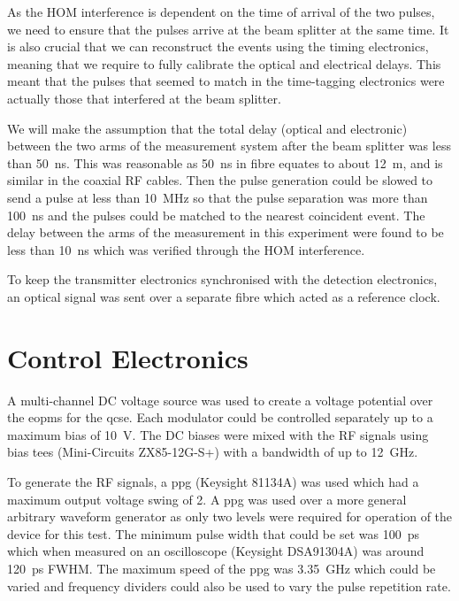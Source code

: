 As the \ac{HOM} interference is dependent on the time of arrival of the two pulses, we need to ensure that the pulses arrive at the beam splitter at the same time. It is also crucial that we can reconstruct the events using the timing electronics, meaning that we require to fully calibrate the optical and electrical delays. This meant that the pulses that seemed to match in the time-tagging electronics were actually those that interfered at the beam splitter. 

We will make the assumption that the total delay (optical and electronic) between the two arms of the measurement system after the beam splitter was less than \SI{50}{\ns}. This was reasonable as \SI{50}{\ns} in fibre equates to about \SI{12}{\m}, and is similar in the coaxial RF cables. Then the pulse generation could be slowed to send a pulse at less than \SI{10}{\MHz} so that the pulse separation was more than \SI{100}{\ns} and the pulses could be matched to the nearest coincident event. The delay between the arms of the measurement in this experiment were found to be less than \SI{10}{\ns} which was verified through the \ac{HOM} interference.

To keep the transmitter electronics synchronised with the detection electronics, an optical signal was sent over a separate fibre which acted as a reference clock. 

\section{Control Electronics}



A multi-channel DC voltage source was used to create a voltage potential over the \acp{eopm} for the \ac{qcse}. Each modulator could be controlled separately up to a maximum bias of \SI{10}{V}. The DC biases were mixed with the RF signals using bias tees (Mini-Circuits ZX85-12G-S+) with a bandwidth of up to \SI{12}{GHz}. 

To generate the RF signals, a \ac{ppg} (Keysight 81134A) was used which had a maximum output voltage swing of \SI{2}{\Vpp}. A \ac{ppg} was used over a more general arbitrary waveform generator as only two levels were required for operation of the device for this test. The minimum pulse width that could be set was \SI{100}{\ps} which when measured on an oscilloscope (Keysight DSA91304A) was around \SI{120}{\ps} \ac{FWHM}. The maximum speed of the \ac{ppg} was \SI{3.35}{\GHz} which could be varied and frequency dividers could also be used to vary the pulse repetition rate. 


